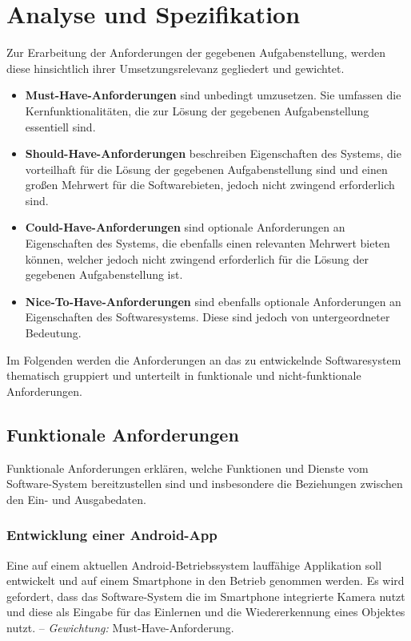 \documentclass[oneside]{ausarbeitung}
\begin{document}
\chapter{Analyse und Spezifikation}
\label{cha:analyse}
Zur Erarbeitung der Anforderungen der gegebenen Aufgabenstellung, werden diese hinsichtlich ihrer Umsetzungsrelevanz gegliedert und gewichtet.
\begin{itemize}
\item \textbf{Must-Have-Anforderungen} sind unbedingt umzusetzen. Sie umfassen die Kernfunktionalitäten, die zur Lösung der gegebenen Aufgabenstellung essentiell sind.
\item \textbf{Should-Have-Anforderungen} beschreiben Eigenschaften des Systems, die vorteilhaft für die Lösung der gegebenen Aufgabenstellung sind und einen großen Mehrwert für die Softwarebieten, jedoch nicht zwingend erforderlich sind.
\item \textbf{Could-Have-Anforderungen} sind optionale Anforderungen an Eigenschaften des Systems, die ebenfalls einen relevanten Mehrwert bieten können, welcher jedoch nicht zwingend erforderlich für die Lösung der gegebenen Aufgabenstellung ist. 
\item \textbf{Nice-To-Have-Anforderungen} sind ebenfalls optionale Anforderungen an Eigenschaften des Softwaresystems. Diese sind jedoch von untergeordneter Bedeutung.
\end{itemize}
Im Folgenden werden die Anforderungen an das zu entwickelnde Softwaresystem thematisch gruppiert und unterteilt in funktionale und nicht-funktionale Anforderungen.
\section{Funktionale Anforderungen}
Funktionale Anforderungen erklären, welche Funktionen und Dienste vom Software-System bereitzustellen sind und insbesondere die Beziehungen zwischen den Ein- und Ausgabedaten.

\subsection{Entwicklung einer Android-App}
Eine auf einem aktuellen Android-Betriebssystem lauffähige Applikation soll entwickelt und auf einem Smartphone in den Betrieb genommen werden. Es wird gefordert, dass das Software-System die im Smartphone integrierte Kamera nutzt und diese als Eingabe für das Einlernen und die Wiedererkennung eines Objektes nutzt.  -- \textit{Gewichtung:} Must-Have-Anforderung.
\end{document}
